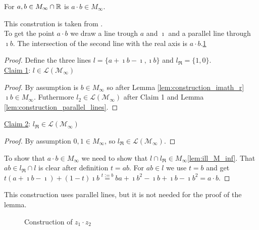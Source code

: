 \begin{lemma}
    \label{lem:construction_mul}
    \leanok
    For $a, b \in M_{\infty}\cap\mathbb{R}$ is $a \cdot b \in M_{\infty}$.
\end{lemma}
This constrution is taken from \cite{cox2012galois}.\\
To get the point $a\cdot b$ we draw a line trough $a$ and $\imath$ and a parallel line through $\imath b$. The intersection of the second line with the real axis is $a\cdot b$.\ref{Fig.5} 
\begin{proof}
    Define the three lines $l = \{a+\imath b - \imath, \imath b\}$ and $l_{\Re} = \{1,0\}$.\\
    \underline{Claim 1}: $l \in \mathcal{L(M_{\infty})}$
    \begin{proof}
        By assumption is $b \in M_{\infty}$ so after Lemma \ref{lem:construction_imath_r} $\imath b \in M_{\infty}$. Futhermore $l_2 \in \mathcal{L(M_{\infty})}$ after Claim 1 and Lemma \ref{lem:construction_parallel_lines}.
    \end{proof}
    \underline{Claim 2}: $l_{\Re} \in \mathcal{L(M_{\infty})}$
    \begin{proof}
        By assumption $0, 1 \in M_{\infty}$, so $l_{\Re} \in \mathcal{L(M_{\infty})}$.
    \end{proof}
    To show that $a\cdot b \in M_{\infty}$ we need to show that $l \cap l_{\Re} \in M_{\infty}$\ref{lem:ill_M_inf}. That $ab \in l_{\Re} \cap l$ is clear after definition $t=ab$. For $ab \in l$ we use $t=b$ and get $t(a+\imath b - \imath) + (1-t)\imath b  \stackrel{t:=b}{=}ba + \imath b^2 -\imath b + \imath b -\imath b^2 = a\cdot b$.
\end{proof}
\begin{remark}
    This construction uses parallel lines, but it is not needed for the proof of the lemma.
\end{remark}
\begin{figure}
    \centering
    \caption{Construction of $z_1 \cdot z_2$}
    \label{Fig.5}
\end{figure}

